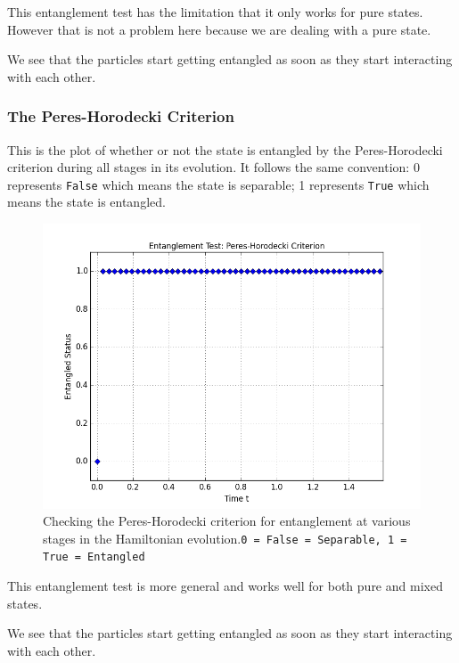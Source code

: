 This entanglement test has the limitation that it only works for pure states. However that is not a problem here because we are dealing with a pure state.
\par We see that the particles start getting entangled as soon as they start interacting with each other.


\pagebreak
\subsubsection{The Peres-Horodecki Criterion}
This is the plot of whether or not the state is entangled by the Peres-Horodecki criterion during all stages in its evolution. It follows the same convention: 0 represents \texttt{False} which means the state is separable; 1 represents \texttt{True} which means the state is entangled.

\begin{center}
\begin{figure}[H]
  \begin{center}
    \includegraphics[scale=0.62]{figures/timeevolution-09.png}
    \caption{Checking the Peres-Horodecki criterion for entanglement at various stages in the Hamiltonian evolution.\newline \texttt{0 = False = Separable,    1 = True = Entangled}}
    \label{fig: Time Evolution: Peres-Horodecki Critetrion}
  \end{center}
\end{figure}
\end{center}

This entanglement test is more general and works well for both pure and mixed states.
\par We see that the particles start getting entangled as soon as they start interacting with each other.


